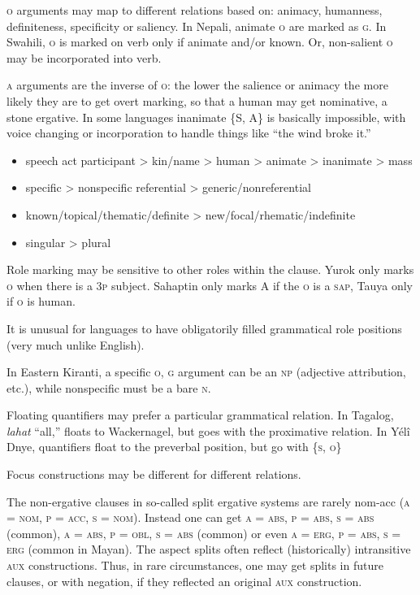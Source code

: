 \documentclass[11pt]{article}
\newcommand{\I}[1]{\textsc{#1}}   %
\newenvironment{grammarlist}%
 {\begin{itemize}\addtolength{\itemsep}{-0.5\baselineskip}\ignorespaces}%
 {\end{itemize}\ignorespacesafterend}
\begin{document}
{\I{o} arguments may map to different relations based on: animacy,
humanness, definiteness, specificity or saliency.  In Nepali, animate
\I{o} are marked as \I{g}.  In Swahili, \I{o} is marked on verb only
if animate and/or known.  Or, non-salient \I{o} may be incorporated
into verb.

\I{a} arguments are the inverse of \I{o}: the lower the salience or
animacy the more likely they are to get overt marking, so that a human
may get nominative, a stone ergative.  In some languages inanimate
\{\I{S, A}\} is basically impossible, with voice changing or
incorporation to handle things like ``the wind broke it.''

\begin{grammarlist}
  \item speech act participant > kin/name > human > animate >
    inanimate > mass
  \item specific > nonspecific referential > generic/nonreferential
  \item known/topical/thematic/definite > new/focal/rhematic/indefinite
  \item singular > plural
\end{grammarlist}

Role marking may be sensitive to other roles within the clause.  Yurok
only marks \I{o} when there is a \I{3p} subject.  Sahaptin only marks
\I{A} if the \I{o} is a \I{sap}, Tauya only if \I{o} is human.

It is unusual for languages to have obligatorily filled grammatical
role positions (very much unlike English).

In Eastern Kiranti, a specific \I{o, g} argument can be an \I{np}
(adjective attribution, etc.), while nonspecific must be a bare
\I{n}.

Floating quantifiers may prefer a particular grammatical relation.  In
Tagalog, \textit{lahat} ``all,'' floats to Wackernagel, but goes with
the proximative relation.  In Yélî Dnye, quantifiers float to the
preverbal position, but go with \{\I{s, o}\}

Focus constructions may be different for different relations.

The non-ergative clauses in so-called split ergative systems are
rarely nom-acc (\I{a = nom, p = acc, s = nom}).  Instead one can get
\I{a = abs, p = abs, s = abs} (common), \I{a = abs, p = obl, s = abs}
(common) or even \I{a = erg, p = abs, s = erg} (common in Mayan).  The
aspect splits often reflect (historically) intransitive \I{aux}
constructions.  Thus, in rare circumstances, one may get splits in
future clauses, or with negation, if they reflected an original
\I{aux} construction.


}
\end{document}
